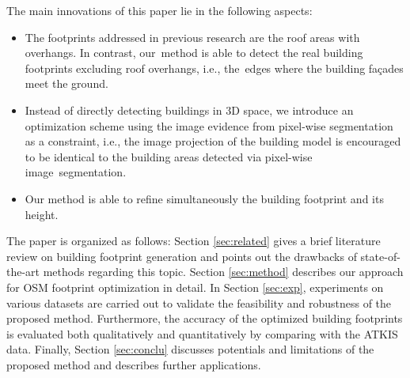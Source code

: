 The main innovations of this paper lie in the following aspects:
\begin{itemize}
\item The footprints addressed in previous research are the roof areas with overhangs. In contrast, our~method is able to detect the real building footprints excluding roof overhangs, i.e., the~edges where the building fa\c{c}ades meet the ground.
\item Instead of directly detecting buildings in 3D space, we introduce an optimization scheme using the image evidence from pixel-wise segmentation as a constraint, i.e., the image projection of the building model is encouraged to be identical to the building areas detected via pixel-wise image~segmentation. 
\item Our method is able to refine simultaneously the building footprint and its height.  
\end{itemize}


The paper is organized as follows: Section \ref{sec:related} gives a brief literature review on building footprint generation and points out the drawbacks of state-of-the-art methods regarding this topic. Section \ref{sec:method} describes our approach for OSM footprint optimization in detail. In Section \ref{sec:exp}, experiments on various datasets are carried out to validate the feasibility and robustness of the proposed method. Furthermore, the accuracy of the optimized building footprints is evaluated both qualitatively and quantitatively by comparing with the ATKIS data. Finally, Section \ref{sec:conclu} discusses potentials and limitations of the proposed method and describes further applications.

